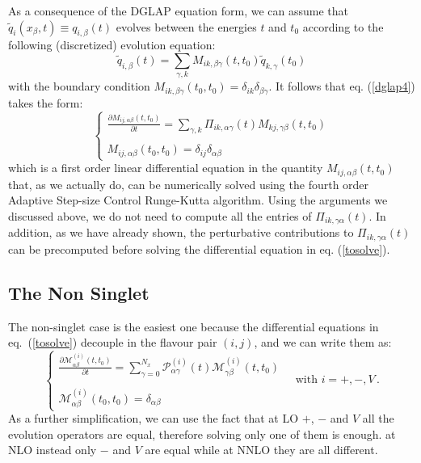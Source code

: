 \documentclass[10pt,a4paper]{article}
\begin{document}
As a consequence of the DGLAP equation form, we can assume that $\tilde{q}_{i}(x_\beta,t)\equiv q_{i,\beta}(t)$ evolves between the energies $t$ and $t_0$ according to the following (discretized) evolution equation:
\begin{equation}
\tilde{q}_{i,\beta}(t) = \sum_{\gamma,k} M_{ik,\beta\gamma}(t,t_0)\tilde{q}_{k,\gamma}(t_0) 
\end{equation}
with the boundary condition $M_{ik,\beta\gamma}(t_0,t_0)=\delta_{ik}\delta_{\beta\gamma}$. It follows that eq. (\ref{dglap4}) takes the form:
\begin{equation}
\left\{\begin{array}{l}
\displaystyle \frac{\partial  M_{ij,\alpha\beta}(t,t_0)}{\partial t}=\sum_{\gamma,k} \Pi_{ik,\alpha\gamma}(t)M_{kj,\gamma\beta}(t,t_0)\\
\\
\displaystyle M_{ij,\alpha\beta}(t_0,t_0)=\delta_{ij}\delta_{\alpha\beta}
\end{array}\right.
\label{tosolve}
\end{equation}
which is a first order linear differential equation in the quantity
$M_{ij,\alpha\beta}(t,t_0)$ that, as we actually do, can be
numerically solved using the fourth order Adaptive Step-size Control Runge-Kutta algorithm.
Using the arguments we discussed above, we do not need to compute all
the entries of $\Pi_{ik,\gamma\alpha}(t)$. In addition, as we have already shown, the
perturbative contributions to $\Pi_{ik,\gamma\alpha}(t)$ can be
precomputed before solving the differential equation in eq. (\ref{tosolve}).


\subsection{The Non Singlet}

The non-singlet case is the easiest one because the differential equations in eq.~(\ref{tosolve}) decouple in the flavour pair $(i,j)$, and we can write them as:
\begin{equation}
\left\{\begin{array}{l}
\displaystyle \frac{\partial  \mathcal{M}_{\alpha\beta}^{(i)}(t,t_0)}{\partial t}=\sum_{\gamma=0}^{N_x} \mathcal{P}_{\alpha\gamma}^{(i)}(t)\mathcal{M}_{\gamma\beta}^{(i)}(t,t_0)\\
\\
\displaystyle \mathcal{M}_{\alpha\beta}^{(i)}(t_0,t_0)=\delta_{\alpha\beta}
\end{array}\right.\quad\mbox{with } i=+,-,V\,.
\label{tosolveNS}
\end{equation}
As a further simplification, we can use the fact that at LO $+$, $-$ and $V$ all the evolution operators are equal, therefore solving only one of them is enough. at NLO instead only $-$ and $V$ are equal while at NNLO they are all different.
\end{document}
